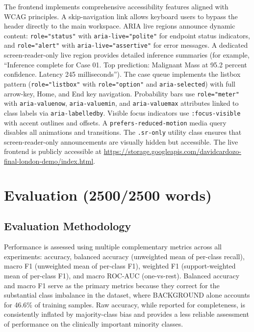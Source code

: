 \documentclass[justified,notoc,openany]{tufte-book}
\begin{document}
The frontend implements comprehensive accessibility features aligned with WCAG principles. A skip-navigation link allows keyboard users to bypass the header directly to the main workspace. ARIA live regions announce dynamic content: \texttt{role="status"} with \texttt{aria-live="polite"} for endpoint status indicators, and \texttt{role="alert"} with \texttt{aria-live="assertive"} for error messages. A dedicated screen-reader-only live region provides detailed inference summaries (for example, ``Inference complete for Case 01. Top prediction: Malignant Mass at 95.2 percent confidence. Latency 245 milliseconds''). The case queue implements the listbox pattern (\texttt{role="listbox"} with \texttt{role="option"} and \texttt{aria-selected}) with full arrow-key, Home, and End key navigation. Probability bars use \texttt{role="meter"} with \texttt{aria-valuenow}, \texttt{aria-valuemin}, and \texttt{aria-valuemax} attributes linked to class labels via \texttt{aria-labelledby}. Visible focus indicators use \texttt{:focus-visible} with accent outlines and offsets. A \texttt{prefers-reduced-motion} media query disables all animations and transitions. The \texttt{.sr-only} utility class ensures that screen-reader-only announcements are visually hidden but accessible. The live frontend is publicly accessible at \url{https://storage.googleapis.com/davidcardozo-final-london-demo/index.html}.

\newpage

\chapter{Evaluation (2500/2500 words)}\label{evaluation-25002500-words}

\section{Evaluation Methodology}\label{evaluation-methodology}

Performance is assessed using multiple complementary metrics across all experiments: accuracy, balanced accuracy (unweighted mean of per-class recall), macro F1 (unweighted mean of per-class F1), weighted F1 (support-weighted mean of per-class F1), and macro ROC-AUC (one-vs-rest). Balanced accuracy and macro F1 serve as the primary metrics because they correct for the substantial class imbalance in the dataset, where BACKGROUND alone accounts for 46.6\% of training samples. Raw accuracy, while reported for completeness, is consistently inflated by majority-class bias and provides a less reliable assessment of performance on the clinically important minority classes.
\end{document}
